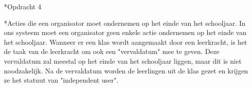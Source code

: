 \begin{section}*{Opdracht 4}
    \begin{subsection}*{Acties die een organisator moet ondernemen op het einde van het schooljaar.}
        In ons systeem moet een organisator geen enkele actie ondernemen op het einde van het schooljaar. Wanneer er een klas wordt aangemaakt door een leerkracht, is het de taak van de leerkracht om ook een "vervaldatum" mee te geven. Deze vervaldatum zal meestal op het einde van het schooljaar liggen, maar dit is niet noodzakelijk. Na de vervaldatum worden de leerlingen uit de klas gezet en krijgen ze het statuut van "independent user". 
    \end{subsection}
    
\end{section}